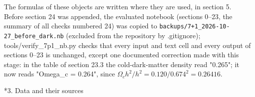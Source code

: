 \documentclass[10pt,a4paper]{article}
\makeatletter
\renewcommand\section{\@startsection{section}{1}{\z@}{-3.5ex \@plus -1ex \@minus -.2ex}{2.3ex \@plus.2ex}{\normalfont\Large\bfseries\raggedright}}
\makeatother
\begin{document}
The formulas of these objects are written where they are used, in section 5. Before section 24 was appended, the evaluated notebook (sections 0–23, the summary of all checks numbered 24) was copied to \texttt{backups/\allowbreak{}7+1\_\allowbreak{}2026-10-27\_\allowbreak{}before\_\allowbreak{}dark.nb} (excluded from the repository by .gitignore); tools/verify\_7p1\_nb.py checks that every input and text cell and every output of sections 0–23 is unchanged, except one documented correction made with this stage: in the table of section 23.3 the cold-dark-matter density read "0.265"; it now reads "Omega\_c = 0.264", since $\Omega_ch^2/h^2=0.120/0.674^2=0.26416$.

\section*{3. Data and their sources}
\end{document}

